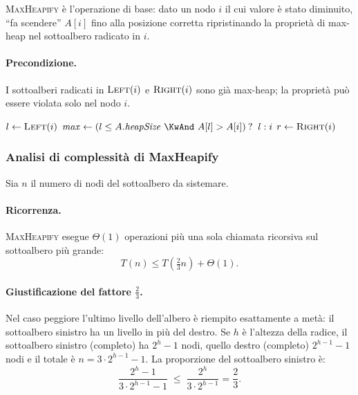 \begin{softnote}
	\textsc{MaxHeapify} è l'operazione di base: dato un nodo $i$ il cui
	valore è stato diminuito, ``fa scendere'' $A[i]$ fino alla posizione
	corretta ripristinando la proprietà di max-heap nel sottoalbero
	radicato in $i$.
\end{softnote}

\paragraph{Precondizione.}
I sottoalberi radicati in $\textsc{Left}(i)$ e $\textsc{Right}(i)$
sono già max-heap; la proprietà può essere violata solo nel nodo $i$.

\begin{algorithm}[H]
	\caption{\textsc{MaxHeapify}$(A, i)$}
	$l \gets \textsc{Left}(i)$\;
	$\mathit{max} \gets (l \le A.\mathit{heapSize}\ \KwAnd\ A[l] > A[i])
	\mathbin{?}\ l : i$
	$r \gets \textsc{Right}(i)$\;
\end{algorithm}

\subsubsection{Analisi di complessità di MaxHeapify}

Sia $n$ il numero di nodi del sottoalbero da sistemare.

\paragraph{Ricorrenza.}
\textsc{MaxHeapify} esegue $\Theta(1)$ operazioni più una sola chiamata
ricorsiva sul sottoalbero più grande:
\[
T(n) \le T\!\left(\tfrac{2}{3}n\right) + \Theta(1).
\]

\paragraph{Giustificazione del fattore $\frac{2}{3}$.}
Nel caso peggiore l'ultimo livello dell'albero è riempito esattamente
a metà: il sottoalbero sinistro ha un livello in più del destro. Se
$h$ è l'altezza della radice, il sottoalbero sinistro (completo) ha
$2^h - 1$ nodi, quello destro (completo) $2^{h-1} - 1$ nodi e
il totale è $n = 3 \cdot 2^{h-1} - 1$. La proporzione del sottoalbero
sinistro è:
\[
\frac{2^h - 1}{3 \cdot 2^{h-1} - 1}
\;\le\; \frac{2^h}{3 \cdot 2^{h-1}}
= \frac{2}{3}.
\]

